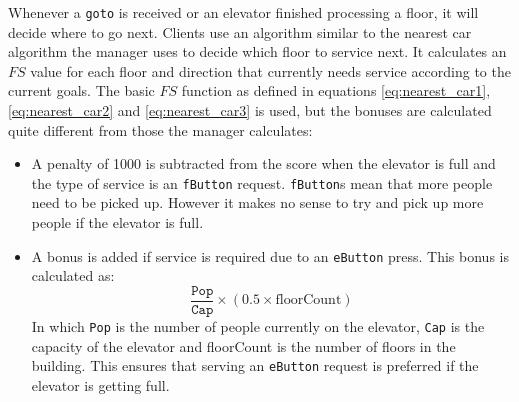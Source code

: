 \documentclass[a4paper,10pt,twocolumn]{article}
\begin{document}
Whenever a \texttt{goto} is received or an elevator finished processing a floor, it will decide where to go next. Clients use an algorithm similar to the nearest car algorithm the manager uses to decide which floor to service next. It calculates an $FS$ value for each floor and direction that currently needs service according to the current goals. The basic $FS$ function as defined in equations \ref{eq:nearest_car1}, \ref{eq:nearest_car2} and \ref{eq:nearest_car3} is used, but the bonuses are calculated quite different from those the manager calculates:
\begin{itemize}
 \item A penalty of 1000 is subtracted from the score when the elevator is full and the type of service is an \texttt{fButton} request. \texttt{fButton}s mean that more people need to be picked up. However it makes no sense to try and pick up more people if the elevator is full.
 \item A bonus is added if service is required due to an \texttt{eButton} press. This bonus is calculated as:
 \begin{equation}
  \frac{\texttt{Pop}}{\texttt{Cap}} \times (0.5 \times \text{floorCount})
 \end{equation}
 In which \texttt{Pop} is the number of people currently on the elevator, \texttt{Cap} is the capacity of the elevator and floorCount is the number of floors in the building. This ensures that serving an \texttt{eButton} request is preferred if the elevator is getting full. 
\end{itemize}
\end{document}
